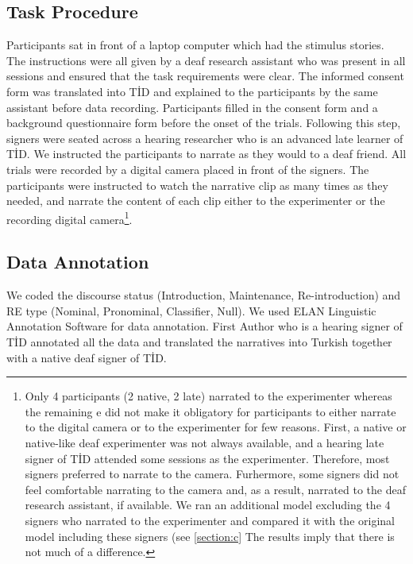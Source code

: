\documentclass[review]{elsarticle} %
\begin{document}
\hypertarget{task-procedure}{%
\subsection{Task Procedure}\label{task-procedure}}

Participants sat in front of a laptop computer which had the stimulus
stories. The instructions were all given by a deaf research assistant
who was present in all sessions and ensured that the task requirements
were clear. The informed consent form was translated into TİD and
explained to the participants by the same assistant before data
recording. Participants filled in the consent form and a background
questionnaire form before the onset of the trials. Following this step,
signers were seated across a hearing researcher who is an advanced late
learner of TİD. We instructed the participants to narrate as they would
to a deaf friend. All trials were recorded by a digital camera placed in
front of the signers. The participants were instructed to watch the
narrative clip as many times as they needed, and narrate the content of
each clip either to the experimenter or the recording digital
camera\footnote{Only 4 participants (2 native, 2 late) narrated to the experimenter whereas the remaining e did not make it obligatory for participants to either narrate to the digital camera or to the experimenter for few reasons. First, a native or native-like deaf experimenter was not always available, and a hearing late signer of TİD attended some sessions as the experimenter. Therefore, most signers preferred to narrate to the camera. Furhermore, some signers did not feel comfortable narrating to the camera and, as a result, narrated to the deaf research assistant, if available. We ran an additional model excluding the 4 signers who narrated to the experimenter and compared it with the original model including these signers (see \ref{section:c} The results imply that there is not much of a difference.}.

\hypertarget{data-annotation}{%
\subsection{Data Annotation}\label{data-annotation}}

We coded the discourse status (Introduction, Maintenance,
Re-introduction) and RE type (Nominal, Pronominal, Classifier, Null). We
used ELAN Linguistic Annotation Software \citep{crasborn2008} for data
annotation. First Author who is a hearing signer of TİD annotated all
the data and translated the narratives into Turkish together with a
native deaf signer of TİD.
\end{document}
